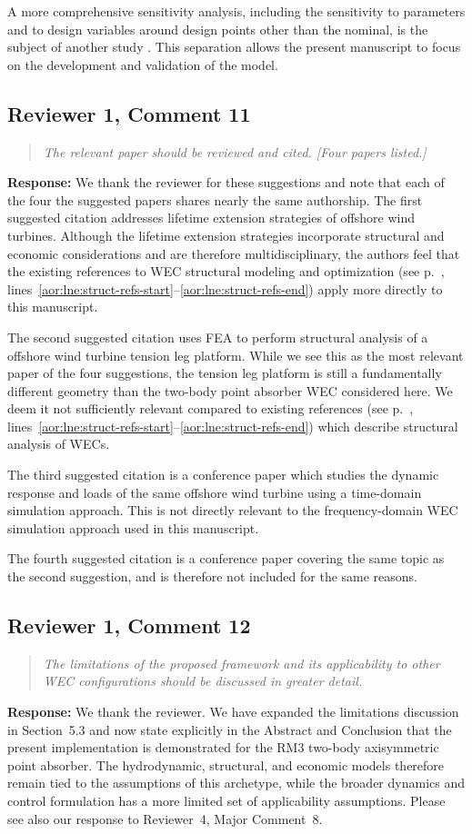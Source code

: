 \documentclass[11pt]{article}
\newcommand{\rcomment}[2]{\subsection*{#1}\begin{quote}\itshape #2\end{quote}}
\newcommand{\response}{\noindent\textbf{Response:} }
\begin{document}
A more comprehensive sensitivity analysis, including the sensitivity to parameters and to design variables around design points other than the nominal, is the subject of another study \citep{aor:mccabe_leveraging_2026}.
This separation allows the present manuscript to focus on the development and validation of the model.

\rcomment{Reviewer 1, Comment 11}{The relevant paper should be reviewed and cited. [Four papers listed.]}
\response We thank the reviewer for these suggestions and note that each of the four the suggested papers shares nearly the same authorship.
The first suggested citation addresses lifetime extension strategies of offshore wind turbines.
Although the lifetime extension strategies incorporate structural and economic considerations and are therefore multidisciplinary, the authors feel that the existing references to WEC structural modeling and optimization
(see p.~\pageref{aor:lne:struct-refs-start}, lines~\ref{aor:lne:struct-refs-start}--\ref{aor:lne:struct-refs-end})
apply more directly to this manuscript.

The second suggested citation uses FEA to perform structural analysis of a offshore wind turbine tension leg platform.
While we see this as the most relevant paper of the four suggestions, the tension leg platform is still a fundamentally different geometry than the two-body point absorber WEC considered here.
We deem it not sufficiently relevant compared to existing references
\citet{aor:coe_survey_2018,aor:ove_arup__partners_ltd_structural_2016,aor:paduano_towards_2024,aor:giannini_wave_2022,aor:an_optimal_2024,aor:ambuhl_reliability-based_2014}
(see p.~\pageref{aor:lne:struct-refs-start}, lines~\ref{aor:lne:struct-refs-start}--\ref{aor:lne:struct-refs-end}) which describe structural analysis of WECs.

The third suggested citation is a conference paper which studies the dynamic response and loads of the same offshore wind turbine using a time-domain simulation approach.
This is not directly relevant to the frequency-domain WEC simulation approach used in this manuscript.

The fourth suggested citation is a conference paper covering the same topic as the second suggestion, and is therefore not included for the same reasons.

\rcomment{Reviewer 1, Comment 12}{The limitations of the proposed framework and its applicability to other WEC configurations should be discussed in greater detail.}
\response We thank the reviewer. We have expanded the limitations discussion in Section~5.3 and now state explicitly in the Abstract and Conclusion that the present implementation is demonstrated for the RM3 two-body axisymmetric point absorber. The hydrodynamic, structural, and economic models therefore remain tied to the assumptions of this archetype, while the broader dynamics and control formulation has a more limited set of applicability assumptions. Please see also our response to Reviewer~4, Major Comment~8.
\end{document}
